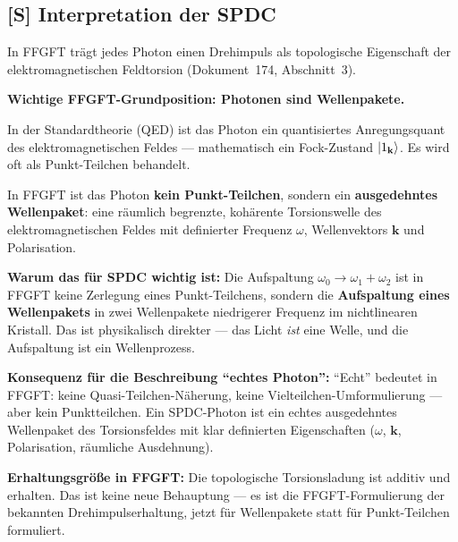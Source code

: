 \subsection{[S] Interpretation der SPDC}

\begin{foundation}
In FFGFT trägt jedes Photon einen Drehimpuls als
topologische Eigenschaft der elektromagnetischen Feldtorsion
(Dokument~174, Abschnitt~3).

\textbf{Wichtige FFGFT-Grundposition: Photonen sind Wellenpakete.}

In der Standardtheorie (QED) ist das Photon ein quantisiertes
Anregungsquant des elektromagnetischen Feldes --- mathematisch
ein Fock-Zustand $\left|1_\mathbf{k}\right\rangle$.
Es wird oft als Punkt-Teilchen behandelt.

In FFGFT ist das Photon \textbf{kein Punkt-Teilchen},
sondern ein \textbf{ausgedehntes Wellenpaket}:
eine räumlich begrenzte, kohärente Torsionswelle des
elektromagnetischen Feldes mit definierter Frequenz $\omega$,
Wellenvektors $\mathbf{k}$ und Polarisation.

\textbf{Warum das für SPDC wichtig ist:}
Die Aufspaltung $\omega_0 \to \omega_1 + \omega_2$ ist
in FFGFT keine Zerlegung eines Punkt-Teilchens,
sondern die \textbf{Aufspaltung eines Wellenpakets}
in zwei Wellenpakete niedrigerer Frequenz im nichtlinearen Kristall.
Das ist physikalisch direkter --- das Licht \emph{ist} eine Welle,
und die Aufspaltung ist ein Wellenprozess.

\begin{center}
\end{center}

\textbf{Konsequenz für die Beschreibung ``echtes Photon'':}
``Echt'' bedeutet in FFGFT: keine Quasi-Teilchen-Näherung,
keine Vielteilchen-Umformulierung --- aber kein Punktteilchen.
Ein SPDC-Photon ist ein echtes ausgedehntes Wellenpaket
des Torsionsfeldes mit klar definierten Eigenschaften
($\omega$, $\mathbf{k}$, Polarisation, räumliche Ausdehnung).

\textbf{Erhaltungsgröße in FFGFT:}
Die topologische Torsionsladung ist additiv und erhalten.
Das ist keine neue Behauptung --- es ist die FFGFT-Formulierung
der bekannten Drehimpulserhaltung, jetzt für Wellenpakete
statt für Punkt-Teilchen formuliert.
\end{foundation}

